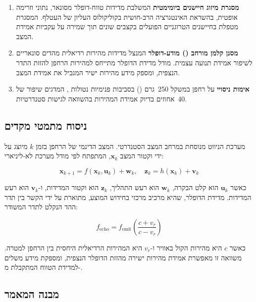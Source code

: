 \begin{enumerate}
\item \textbf{מסגרת מיזוג חיישנים ביומימטית} המשלבת מדידות טווח-דופלר מסונאר, נתוני  וזרימה אופטית, בהשראת האינטגרציה הרב-חושית בקוליקולוס העליון של העטלף. המסגרת מטפלת בחיישנים הטרוגניים הפועלים בקצבים שונים תוך שמירה על עקביות אמידת המצב.
\item \textbf{מסנן קלמן מורחב () מודע-דופלר} המנצל מדידות מהירות רדיאלית מהדים סונאריים לשיפור אמידת תנועה עצמית. מודל מדידת הדופלר מתייחס למהירות הרחפן להזזת התדר הנצפית, ומספק מידע מהירות ישיר המגביל את אמידת המצב.
\item \textbf{אימות ניסויי} על רחפן במשקל 250~גרם () בסביבות פנימיות נטולות , המדגים שיפור של 40~אחוזים בדיוק אמידת המהירות בהשוואה לגישות  סטנדרטיות.
\end{enumerate}

\subsection{ניסוח מתמטי מקדים}
\label{sec:math_preview}

מערכת הניווט מנוסחת במרחב המצב הסטנדרטי. המצב הדינמי של הרחפן בזמן $k$ מיוצג על ידי וקטור המצב $\mathbf{x}_k$, המתפתח לפי מודל מערכת לא-ליניארי:

\begin{equation}
\mathbf{x}_{k+1} = f(\mathbf{x}_k, \mathbf{u}_k) + \mathbf{w}_k, \quad \mathbf{z}_k = h(\mathbf{x}_k) + \mathbf{v}_k
\label{eq:ch01_state_space}
\end{equation}

כאשר $\mathbf{u}_k$ הוא קלט הבקרה, $\mathbf{w}_k$ הוא רעש התהליך, $\mathbf{z}_k$ הוא וקטור המדידות, ו-$\mathbf{v}_k$ הוא רעש המדידות. מדידת הדופלר, שהיא מרכיב מרכזי בחידוש המוצע, מתוארת על ידי הקשר בין תדר ההד הנקלט לתדר המשודר:

\begin{equation}
f_{\text{echo}} = f_{\text{emit}} \left( \frac{c + v_r}{c - v_r} \right)
\label{eq:ch01_doppler}
\end{equation}

כאשר $c$ היא מהירות הקול באוויר ו-$v_r$ היא המהירות הרדיאלית היחסית בין הרחפן למטרה. משוואה זו מאפשרת אמידת מהירות ישירה מהזזת הדופלר הנצפית, ומספקת מידע משלים למדידת הטווח המתקבלת מ-.

\subsection{מבנה המאמר}
\label{sec:structure}


